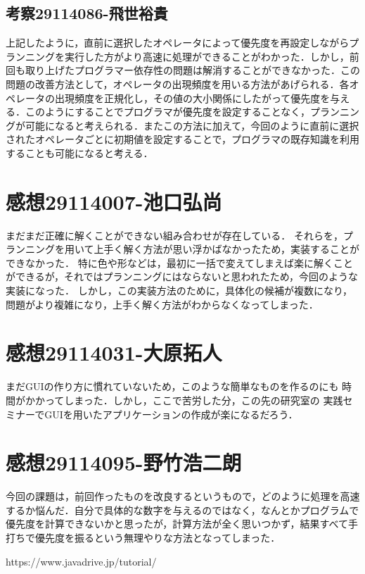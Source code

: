 \documentclass{jarticle}
\begin{document}
\subsection{考察29114086-飛世裕貴}
上記したように，直前に選択したオペレータによって優先度を再設定しながらプランニングを実行した方がより高速に処理ができることがわかった．しかし，前回も取り上げたプログラマー依存性の問題は解消することができなかった．この問題の改善方法として，オペレータの出現頻度を用いる方法があげられる．各オペレータの出現頻度を正規化し，その値の大小関係にしたがって優先度を与える．このようにすることでプログラマが優先度を設定することなく，プランニングが可能になると考えられる．またこの方法に加えて，今回のように直前に選択されたオペレータごとに初期値を設定することで，プログラマの既存知識を利用することも可能になると考える．

\section{感想29114007-池口弘尚}
まだまだ正確に解くことができない組み合わせが存在している．
それらを，プランニングを用いて上手く解く方法が思い浮かばなかったため，実装することができなかった．
特に色や形などは，最初に一括で変えてしまえば楽に解くことができるが，それではプランニングにはならないと思われたため，今回のような実装になった．
しかし，この実装方法のために，具体化の候補が複数になり，問題がより複雑になり，上手く解く方法がわからなくなってしまった．
\section{感想29114031-大原拓人}
まだGUIの作り方に慣れていないため，このような簡単なものを作るのにも
時間がかかってしまった．しかし，ここで苦労した分，この先の研究室の
実践セミナーでGUIを用いたアプリケーションの作成が楽になるだろう．
\section{感想29114095-野竹浩二朗}
今回の課題は，前回作ったものを改良するというもので，どのように処理を高速するか悩んだ．自分で具体的な数字を与えるのではなく，なんとかプログラムで優先度を計算できないかと思ったが，計算方法が全く思いつかず，結果すべて手打ちで優先度を振るという無理やりな方法となってしまった．

\begin{thebibliography}{99}
     https://www.javadrive.jp/tutorial/
\end{thebibliography}
\end{document}
